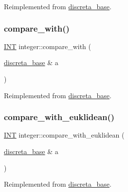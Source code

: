 Reimplemented from \mbox{\hyperlink{classdiscreta__base_a712a61311eb036d70a52871ed315f515}{discreta\+\_\+base}}.

\mbox{\label{classinteger_a20cc8d8d4913e9ee746c6758bbb2e62a}} 
\subsubsection{\texorpdfstring{compare\+\_\+with()}{compare\_with()}}
{\footnotesize\ttfamily \mbox{\hyperlink{galois_8h_a09fddde158a3a20bd2dcadb609de11dc}{I\+NT}} integer\+::compare\+\_\+with (\begin{DoxyParamCaption}\item[{\mbox{\hyperlink{classdiscreta__base}{discreta\+\_\+base}} \&}]{a }\end{DoxyParamCaption})\hspace{0.3cm}{\ttfamily [virtual]}}



Reimplemented from \mbox{\hyperlink{classdiscreta__base_a3818444c4301d0b7ed47c3b850ea6c60}{discreta\+\_\+base}}.

\mbox{\label{classinteger_a903a43b71a9f65f6b7edb443997f5f0e}} 
\subsubsection{\texorpdfstring{compare\+\_\+with\+\_\+euklidean()}{compare\_with\_euklidean()}}
{\footnotesize\ttfamily \mbox{\hyperlink{galois_8h_a09fddde158a3a20bd2dcadb609de11dc}{I\+NT}} integer\+::compare\+\_\+with\+\_\+euklidean (\begin{DoxyParamCaption}\item[{\mbox{\hyperlink{classdiscreta__base}{discreta\+\_\+base}} \&}]{a }\end{DoxyParamCaption})\hspace{0.3cm}{\ttfamily [virtual]}}



Reimplemented from \mbox{\hyperlink{classdiscreta__base_a9d3091feb2fbc69359c2a45f11ceec9e}{discreta\+\_\+base}}.

\mbox{\label{classinteger_a0258f5ab80826ddd4d845a52a6c450b2}} 
